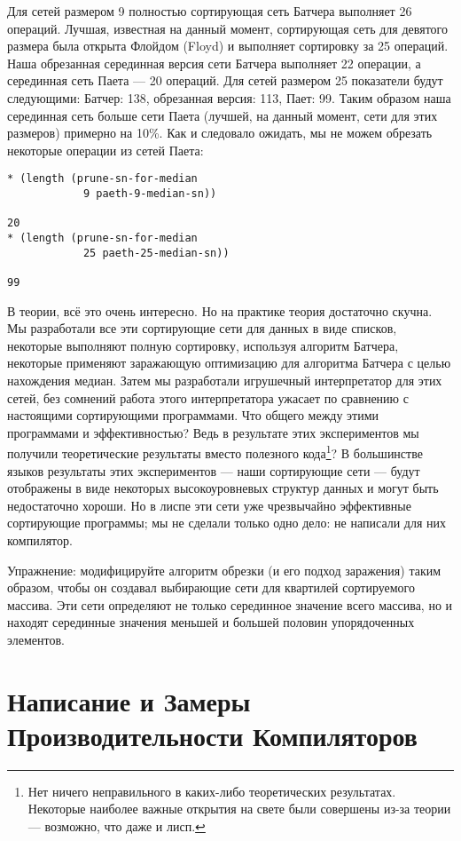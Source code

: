 Для сетей размером 9 полностью сортирующая сеть Батчера выполняет 26 операций. Лучшая, известная на данный момент, сортирующая сеть для девятого размера была открыта Флойдом (Floyd) и выполняет сортировку за 25 операций. Наша обрезанная серединная версия сети Батчера выполняет 22 операции, а серединная сеть Паета --- 20 операций. Для сетей размером 25 показатели будут следующими: Батчер: 138, обрезанная версия: 113, Пает: 99. Таким образом наша серединная сеть больше сети Паета (лучшей, на данный момент, сети для этих размеров) примерно на 10\%. Как и следовало ожидать, мы не можем обрезать некоторые операции из сетей Паета:

\begin{verbatim}
* (length (prune-sn-for-median
            9 paeth-9-median-sn))

20
* (length (prune-sn-for-median
            25 paeth-25-median-sn))

99
\end{verbatim}

В теории, всё это очень интересно. Но на практике теория достаточно скучна. Мы разработали все эти сортирующие сети для данных в виде списков, некоторые выполняют полную сортировку, используя алгоритм Батчера, некоторые применяют заражающую оптимизацию для алгоритма Батчера с целью нахождения медиан. Затем мы разработали игрушечный интерпретатор для этих сетей, без сомнений работа этого интерпретатора ужасает по сравнению с настоящими сортирующими программами. Что общего между этими программами и эффективностью? Ведь в результате этих экспериментов мы получили теоретические результаты вместо полезного кода\footnote{Нет ничего неправильного в каких-либо теоретических результатах. Некоторые наиболее важные открытия на свете были совершены из-за теории --- возможно, что даже и лисп.}? В большинстве языков результаты этих экспериментов --- наши сортирующие сети --- будут отображены в виде некоторых высокоуровневых структур данных и могут быть недостаточно хороши. Но в лиспе эти сети уже чрезвычайно эффективные сортирующие программы; мы не сделали только одно дело: не написали для них компилятор.

Упражнение: модифицируйте алгоритм обрезки (и его подход заражения) таким образом, чтобы он создавал выбирающие сети для квартилей сортируемого массива. Эти сети определяют не только серединное значение всего массива, но и находят серединные значения меньшей и большей половин упорядоченных элементов.

\section{Написание и Замеры Производительности Компиляторов}\label{writing_and_benchmarking_compilers}

